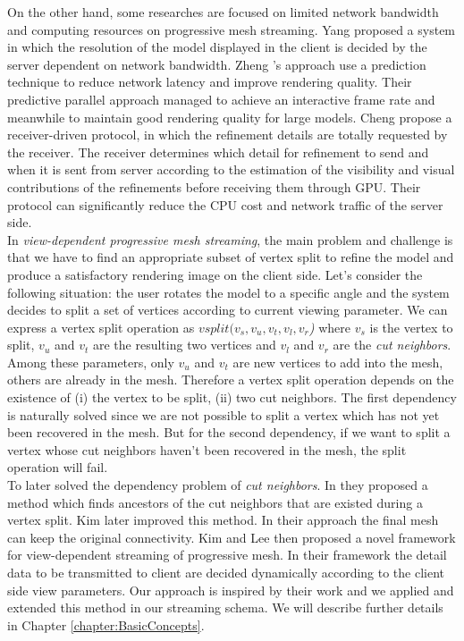 On the other hand, some researches are focused on limited network bandwidth and computing resources on progressive mesh streaming. Yang \etal \cite{Yang:2004:VDMeshTrans} proposed a system in which the resolution of the model displayed in the client is decided by the server dependent on network bandwidth. Zheng \etal's approach \cite{Zheng:08:IVRN} use a prediction technique to reduce network latency and improve rendering quality. Their predictive parallel approach managed to achieve an interactive frame rate and meanwhile to maintain good rendering quality for large models. Cheng \etal \cite{Cheng:2008:RVS} propose a receiver-driven protocol, in which the refinement details are totally requested by the receiver. The receiver determines which detail for refinement to send and when it is sent from server according to the estimation of the visibility and visual contributions of the refinements before receiving them through GPU. Their protocol can significantly reduce the CPU cost and network traffic of the server side. \\

In \emph{view-dependent progressive mesh streaming}, the main problem and challenge is that we have to find an appropriate subset of vertex split to refine the model and produce a satisfactory rendering image on the client side. Let's consider the following situation: the user rotates the model to a specific angle and the system decides to split a set of vertices according to current viewing parameter. We can express a vertex split operation as \emph{$vsplit(v_s, v_u, v_t, v_l, v_r$)} where \emph{$v_s$} is the vertex to split, \emph{$v_u$} and \emph{$v_t$} are the resulting two vertices and \emph{$v_l$} and \emph{$v_r$} are the \emph{cut neighbors}. Among these parameters, only $v_u$ and $v_t$ are new vertices to add into the mesh, others are already in the mesh. Therefore a vertex split operation depends on the existence of (i) the vertex to be split, (ii) two cut neighbors. The first dependency is naturally solved since we are not possible to split a vertex which has not yet been recovered in the mesh. But for the second dependency, if we want to split a vertex whose cut neighbors haven't been recovered in the mesh, the split operation will fail. \\

To \etal later solved the dependency problem of \emph{cut neighbors}. In \cite{To:1999:MPS} they proposed a method which finds ancestors of the cut neighbors that are existed during a vertex split. Kim \etal \cite{Kim:2001:trulyselective} later improved this method. In their approach the final mesh can keep the original connectivity. Kim and Lee \etal\cite{Kim:04:VDstreaming} then proposed a novel framework for view-dependent streaming of progressive mesh. In their framework the detail data to be transmitted to client are decided dynamically according to the client side view parameters. Our approach is inspired by their work and we applied and extended this method in our streaming schema. We will describe further details in Chapter \ref{chapter:BasicConcepts}. \\

